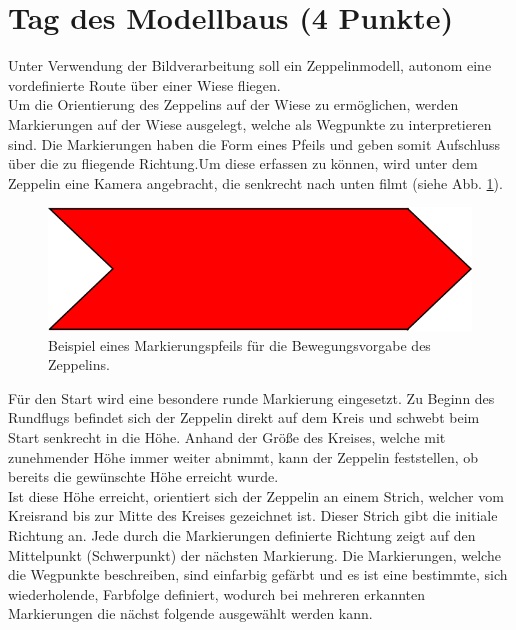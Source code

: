 \documentclass{ezb}
\begin{document}
\section{Tag des Modellbaus (4 Punkte)}
Unter Verwendung der Bildverarbeitung soll ein Zeppelinmodell, autonom eine vordefinierte Route über einer Wiese fliegen.\\
\linebreak
Um die Orientierung des Zeppelins auf der Wiese zu ermöglichen, werden Markierungen auf der Wiese ausgelegt, welche als Wegpunkte zu interpretieren sind. Die Markierungen haben die Form eines Pfeils und geben somit Aufschluss über die zu fliegende Richtung.Um diese erfassen zu können, wird unter dem Zeppelin eine Kamera angebracht, die senkrecht nach unten filmt (siehe Abb. \ref{fig1}).\\ 
\begin{figure}[h]
	\centering
  \includegraphics{richtungspfeil.png}
	\caption{Beispiel eines Markierungspfeils für die Bewegungsvorgabe des Zeppelins.}
	\label{fig1}
\end{figure}
\linebreak
Für den Start wird eine besondere runde Markierung eingesetzt. Zu Beginn des Rundflugs befindet sich der Zeppelin direkt auf dem Kreis und schwebt beim Start senkrecht in die Höhe. Anhand der Größe des Kreises, welche mit zunehmender Höhe immer weiter abnimmt, kann der Zeppelin feststellen, ob bereits die gewünschte Höhe erreicht wurde.\\ 
\linebreak
Ist diese Höhe erreicht, orientiert sich der Zeppelin an einem Strich, welcher vom Kreisrand bis zur Mitte des Kreises gezeichnet ist. Dieser Strich gibt die initiale Richtung an. Jede durch die Markierungen definierte Richtung zeigt auf den Mittelpunkt (Schwerpunkt) der nächsten Markierung. Die Markierungen, welche die Wegpunkte beschreiben, sind einfarbig gefärbt und es ist eine bestimmte, sich wiederholende, Farbfolge definiert, wodurch bei mehreren erkannten Markierungen die nächst folgende ausgewählt werden kann.\\ 
\linebreak
\end{document}

